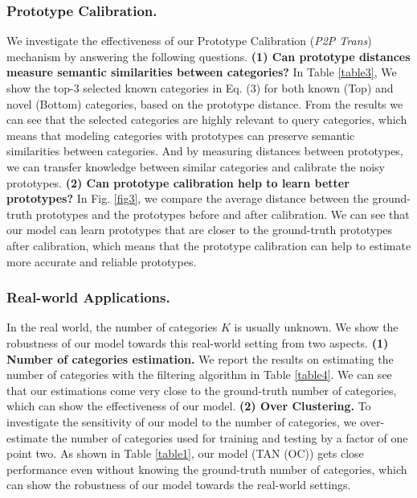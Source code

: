 \documentclass[letterpaper]{article} %
\begin{document}
\subsubsection{Prototype Calibration. } \label{cali} We investigate the effectiveness of our Prototype Calibration (\textit{P2P Trans}) mechanism by answering the following questions.
\textbf{(1) Can prototype distances measure semantic similarities between categories?} In Table \ref{table3}, We show the top-3 selected known categories in Eq. (3) for both known (Top) and novel (Bottom) categories, based on the prototype distance. From the results we can see that the selected categories are highly relevant to query categories, which means that modeling categories with prototypes can preserve semantic similarities between categories. And by measuring distances between prototypes, we can transfer knowledge between similar categories and calibrate the noisy prototypes.
\textbf{(2) Can prototype calibration help to learn better prototypes?} In Fig. \ref{fig3}, we compare the average distance between the ground-truth prototypes and the prototypes before and after calibration. We can see that our model can learn prototypes that are closer to the ground-truth prototypes after calibration, which means that the prototype calibration can help to estimate more accurate and reliable prototypes.








\subsubsection{Real-world Applications. } In the real world, the number of categories $K$ is usually unknown. We show the robustness of our model towards this real-world setting from two aspects. \textbf{(1) Number of categories estimation.} We report the results on estimating the number of categories with the filtering algorithm \citep{thu2021} in Table \ref{table4}. We can see that our estimations come very close to the ground-truth number of categories, which can show the effectiveness of our model. \textbf{(2) Over Clustering. } To investigate the sensitivity of our model to the number of categories, we over-estimate the number of categories used for training and testing by a factor of one point two. As shown in Table \ref{table1}, our model (TAN (OC)) gets close performance even without knowing the ground-truth number of categories, which can show the robustness of our model towards the real-world settings.
\end{document}
